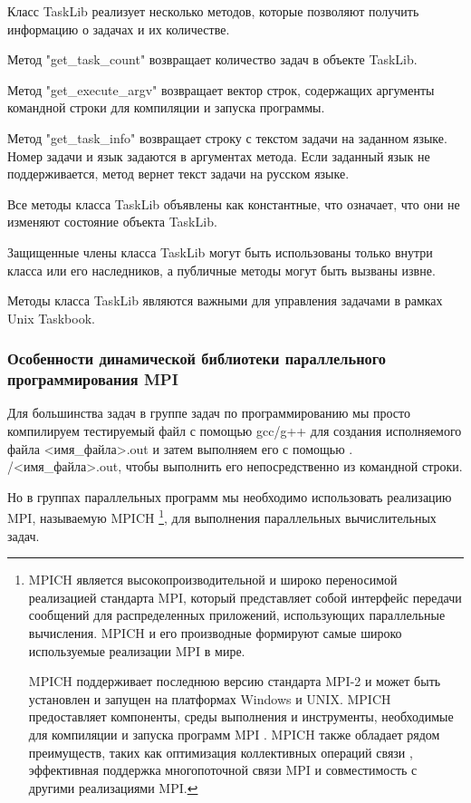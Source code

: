 Класс TaskLib реализует несколько методов, которые позволяют получить информацию о задачах и их количестве.

Метод "get\_task\_count" возвращает количество задач в объекте TaskLib.

Метод "get\_execute\_argv" возвращает вектор строк, содержащих аргументы командной строки для компиляции и запуска программы.

Метод "get\_task\_info" возвращает строку с текстом задачи на заданном языке. Номер задачи и язык задаются в аргументах метода. Если заданный язык не поддерживается, метод вернет текст задачи на русском языке.

Все методы класса TaskLib объявлены как константные, что означает, что они не изменяют состояние объекта TaskLib.

Защищенные члены класса TaskLib могут быть использованы только внутри класса или его наследников, а публичные методы могут быть вызваны извне.

Методы класса TaskLib являются важными для управления задачами в рамках Unix Taskbook.

\subsubsection{Особенности динамической библиотеки параллельного программирования MPI}

Для большинства задач в группе задач по программированию мы просто компилируем тестируемый файл с помощью gcc/g++ для создания 
исполняемого файла <имя\_файла>.out и затем выполняем его с помощью . /<имя\_файла>.out, чтобы выполнить его непосредственно из командной строки.

Но в группах параллельных программ мы необходимо использовать реализацию MPI, называемую MPICH
\footnote{MPICH является высокопроизводительной и широко переносимой реализацией 
стандарта MPI, который представляет собой интерфейс передачи сообщений для распределенных 
приложений, использующих параллельные вычисления. MPICH и его производные формируют самые 
широко используемые реализации MPI в мире. 

MPICH поддерживает последнюю версию стандарта MPI-2 и может быть установлен и запущен
 на платформах Windows и UNIX. MPICH предоставляет компоненты, среды выполнения и 
 инструменты, необходимые для компиляции и запуска программ MPI \cite{ref3} \cite{ref5}. 
 MPICH также обладает рядом преимуществ, таких как оптимизация коллективных операций 
 связи \cite{ref4}, эффективная поддержка многопоточной связи MPI  и совместимость с 
 другими реализациями MPI.}, для выполнения параллельных вычислительных задач. 

